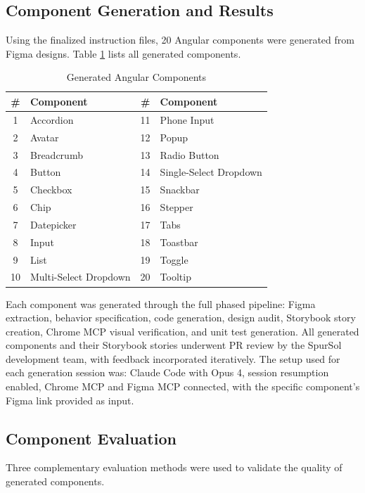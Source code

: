 \subsection{Component Generation and Results}

Using the finalized instruction files, 20 Angular components were generated from Figma designs. Table \ref{tab:components} lists all generated components.

\begin{table}[H]
\centering
\caption{Generated Angular Components}
\label{tab:components}
\begin{tabular}{|c|l|c|l|}
\hline
\textbf{\#} & \textbf{Component} & \textbf{\#} & \textbf{Component} \\ \hline
1 & Accordion & 11 & Phone Input \\ \hline
2 & Avatar & 12 & Popup \\ \hline
3 & Breadcrumb & 13 & Radio Button \\ \hline
4 & Button & 14 & Single-Select Dropdown \\ \hline
5 & Checkbox & 15 & Snackbar \\ \hline
6 & Chip & 16 & Stepper \\ \hline
7 & Datepicker & 17 & Tabs \\ \hline
8 & Input & 18 & Toastbar \\ \hline
9 & List & 19 & Toggle \\ \hline
10 & Multi-Select Dropdown & 20 & Tooltip \\ \hline
\end{tabular}
\end{table}

Each component was generated through the full phased pipeline: Figma extraction, behavior specification, code generation, design audit, Storybook story creation, Chrome MCP visual verification, and unit test generation. All generated components and their Storybook stories underwent PR review by the SpurSol development team, with feedback incorporated iteratively. The setup used for each generation session was: Claude Code with Opus 4, session resumption enabled, Chrome MCP and Figma MCP connected, with the specific component's Figma link provided as input.

\subsection{Component Evaluation}

Three complementary evaluation methods were used to validate the quality of generated components.

